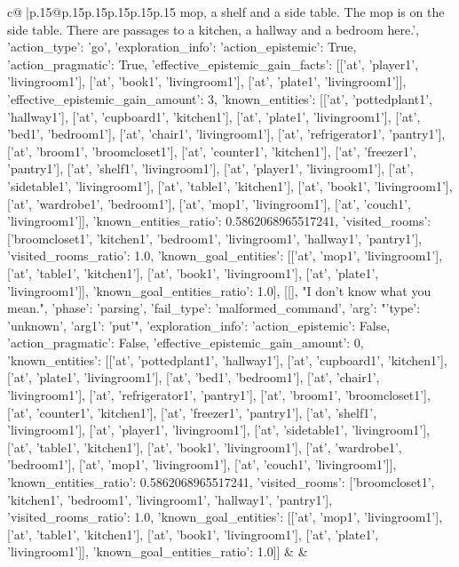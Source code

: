 \documentclass{article}
\begin{document}
{\begin{supertabular}{c@{$\;$}|p{.15\linewidth}@{}p{.15\linewidth}p{.15\linewidth}p{.15\linewidth}p{.15\linewidth}p{.15\linewidth}}
{{{mop, a shelf and a side table. The mop is on the side table. There are passages to a kitchen, a hallway and a bedroom here.', {'action_type': 'go', 'exploration_info': {'action_epistemic': True, 'action_pragmatic': True, 'effective_epistemic_gain_facts': [['at', 'player1', 'livingroom1'], ['at', 'book1', 'livingroom1'], ['at', 'plate1', 'livingroom1']], 'effective_epistemic_gain_amount': 3, 'known_entities': [['at', 'pottedplant1', 'hallway1'], ['at', 'cupboard1', 'kitchen1'], ['at', 'plate1', 'livingroom1'], ['at', 'bed1', 'bedroom1'], ['at', 'chair1', 'livingroom1'], ['at', 'refrigerator1', 'pantry1'], ['at', 'broom1', 'broomcloset1'], ['at', 'counter1', 'kitchen1'], ['at', 'freezer1', 'pantry1'], ['at', 'shelf1', 'livingroom1'], ['at', 'player1', 'livingroom1'], ['at', 'sidetable1', 'livingroom1'], ['at', 'table1', 'kitchen1'], ['at', 'book1', 'livingroom1'], ['at', 'wardrobe1', 'bedroom1'], ['at', 'mop1', 'livingroom1'], ['at', 'couch1', 'livingroom1']], 'known_entities_ratio': 0.5862068965517241, 'visited_rooms': ['broomcloset1', 'kitchen1', 'bedroom1', 'livingroom1', 'hallway1', 'pantry1'], 'visited_rooms_ratio': 1.0, 'known_goal_entities': [['at', 'mop1', 'livingroom1'], ['at', 'table1', 'kitchen1'], ['at', 'book1', 'livingroom1'], ['at', 'plate1', 'livingroom1']], 'known_goal_entities_ratio': 1.0}}], [[], "I don't know what you mean.", {'phase': 'parsing', 'fail_type': 'malformed_command', 'arg': "{'type': 'unknown', 'arg1': 'put'}", 'exploration_info': {'action_epistemic': False, 'action_pragmatic': False, 'effective_epistemic_gain_amount': 0, 'known_entities': [['at', 'pottedplant1', 'hallway1'], ['at', 'cupboard1', 'kitchen1'], ['at', 'plate1', 'livingroom1'], ['at', 'bed1', 'bedroom1'], ['at', 'chair1', 'livingroom1'], ['at', 'refrigerator1', 'pantry1'], ['at', 'broom1', 'broomcloset1'], ['at', 'counter1', 'kitchen1'], ['at', 'freezer1', 'pantry1'], ['at', 'shelf1', 'livingroom1'], ['at', 'player1', 'livingroom1'], ['at', 'sidetable1', 'livingroom1'], ['at', 'table1', 'kitchen1'], ['at', 'book1', 'livingroom1'], ['at', 'wardrobe1', 'bedroom1'], ['at', 'mop1', 'livingroom1'], ['at', 'couch1', 'livingroom1']], 'known_entities_ratio': 0.5862068965517241, 'visited_rooms': ['broomcloset1', 'kitchen1', 'bedroom1', 'livingroom1', 'hallway1', 'pantry1'], 'visited_rooms_ratio': 1.0, 'known_goal_entities': [['at', 'mop1', 'livingroom1'], ['at', 'table1', 'kitchen1'], ['at', 'book1', 'livingroom1'], ['at', 'plate1', 'livingroom1']], 'known_goal_entities_ratio': 1.0}}]] 
	  } 
	   } 
	   } 
	 & & \\ 
 


\end{supertabular}}
\end{document}
